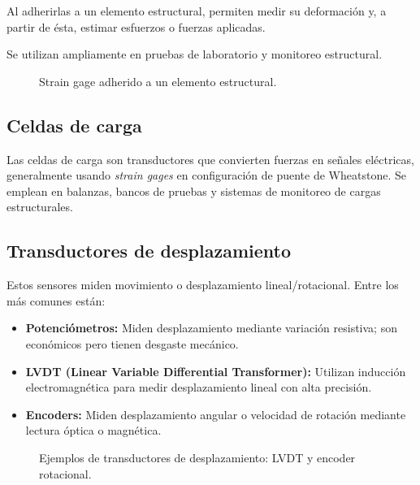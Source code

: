 Al adherirlas a un elemento estructural, permiten medir su deformación y, a partir de ésta, estimar esfuerzos o fuerzas aplicadas.  

Se utilizan ampliamente en pruebas de laboratorio y monitoreo estructural.

\begin{figure}[h!]
    \centering
    \fbox{\rule{0pt}{6cm} \rule{10cm}{0pt}}
    \caption{Strain gage adherido a un elemento estructural.}
\end{figure}

\subsection{Celdas de carga}
Las celdas de carga son transductores que convierten fuerzas en señales eléctricas, generalmente usando \emph{strain gages} en configuración de puente de Wheatstone.  
Se emplean en balanzas, bancos de pruebas y sistemas de monitoreo de cargas estructurales.

\subsection{Transductores de desplazamiento}
Estos sensores miden movimiento o desplazamiento lineal/rotacional. Entre los más comunes están:
\begin{itemize}
    \item \textbf{Potenciómetros:} Miden desplazamiento mediante variación resistiva; son económicos pero tienen desgaste mecánico.
    \item \textbf{LVDT (Linear Variable Differential Transformer):} Utilizan inducción electromagnética para medir desplazamiento lineal con alta precisión.
    \item \textbf{Encoders:} Miden desplazamiento angular o velocidad de rotación mediante lectura óptica o magnética.
\end{itemize}

\begin{figure}[h!]
    \centering
    \fbox{\rule{0pt}{6cm} \rule{10cm}{0pt}}
    \caption{Ejemplos de transductores de desplazamiento: LVDT y encoder rotacional.}
\end{figure}

